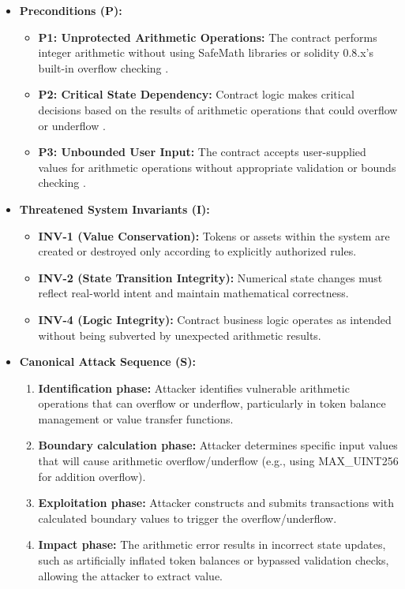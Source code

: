 \begin{itemize}
\item \textbf{Preconditions (P):}
    \begin{itemize}
    \item \textbf{P1: Unprotected Arithmetic Operations:} The contract performs integer arithmetic without using SafeMath libraries or solidity 0.8.x's built-in overflow checking \cite{praitheeshan2019systematic}.
    \item \textbf{P2: Critical State Dependency:} Contract logic makes critical decisions based on the results of arithmetic operations that could overflow or underflow \cite{perez2021analysis}.
    \item \textbf{P3: Unbounded User Input:} The contract accepts user-supplied values for arithmetic operations without appropriate validation or bounds checking \cite{zhou2023sok}.
    \end{itemize}

\item \textbf{Threatened System Invariants (I):}
    \begin{itemize}
    \item \textbf{INV-1 (Value Conservation):} Tokens or assets within the system are created or destroyed only according to explicitly authorized rules.
    \item \textbf{INV-2 (State Transition Integrity):} Numerical state changes must reflect real-world intent and maintain mathematical correctness.
    \item \textbf{INV-4 (Logic Integrity):} Contract business logic operates as intended without being subverted by unexpected arithmetic results.
    \end{itemize}

\item \textbf{Canonical Attack Sequence (S):}
    \begin{enumerate}
    \item \textbf{Identification phase:} Attacker identifies vulnerable arithmetic operations that can overflow or underflow, particularly in token balance management or value transfer functions.
    \item \textbf{Boundary calculation phase:} Attacker determines specific input values that will cause arithmetic overflow/underflow (e.g., using MAX\_UINT256 for addition overflow).
    \item \textbf{Exploitation phase:} Attacker constructs and submits transactions with calculated boundary values to trigger the overflow/underflow.
    \item \textbf{Impact phase:} The arithmetic error results in incorrect state updates, such as artificially inflated token balances or bypassed validation checks, allowing the attacker to extract value.
    \end{enumerate}
\end{itemize}

